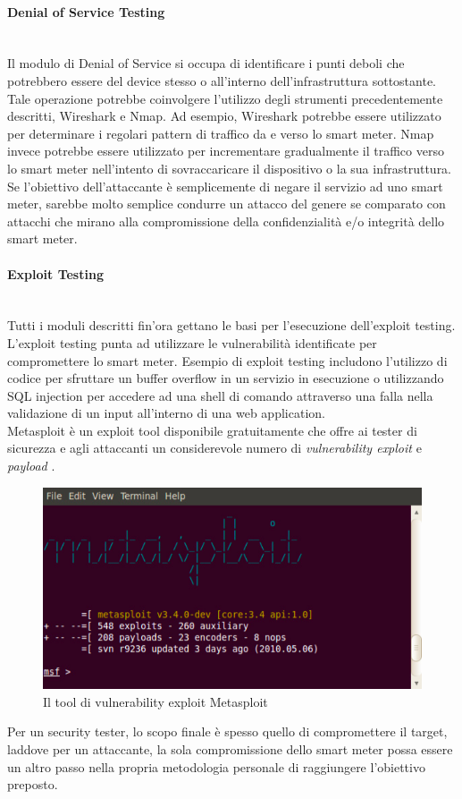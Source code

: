 \paragraph{Denial of Service Testing}\mbox{}\\
Il modulo di Denial of Service si occupa di identificare i punti deboli che potrebbero essere del device stesso o all'interno dell'infrastruttura sottostante. Tale operazione potrebbe coinvolgere l'utilizzo degli strumenti precedentemente descritti, Wireshark e Nmap. Ad esempio, Wireshark potrebbe essere utilizzato per determinare i regolari pattern di traffico da e verso lo smart meter. Nmap invece potrebbe essere utilizzato per incrementare gradualmente il traffico verso lo smart meter nell'intento di sovraccaricare il dispositivo o la sua infrastruttura.\\
Se l'obiettivo dell'attaccante è semplicemente di negare il servizio ad uno smart meter, sarebbe molto semplice condurre un attacco del genere se comparato con attacchi che mirano alla compromissione della confidenzialità e/o integrità dello smart meter.

\paragraph{Exploit Testing}\mbox{}\\
Tutti i moduli descritti fin'ora gettano le basi per l'esecuzione dell'exploit testing. L'exploit testing punta ad utilizzare le vulnerabilità identificate per compromettere lo smart meter. Esempio di exploit testing includono l'utilizzo di codice per sfruttare un buffer overflow in un servizio in esecuzione o utilizzando SQL injection per accedere ad una shell di comando attraverso una falla nella validazione di un input all'interno di una web application.\\
Metasploit è un exploit tool disponibile gratuitamente che offre ai tester di sicurezza e agli attaccanti un considerevole numero di \emph{vulnerability exploit} e \emph{payload} \cite{metasploit}.
\begin{figure}[hbtp]
	\centering
	\includegraphics[scale=.3]{imgs/attack/metasploit.png}
	\caption{Il tool di vulnerability exploit Metasploit}
	\label{metasploit_img}
\end{figure}
Per un security tester, lo scopo finale è spesso quello di compromettere il target, laddove per un attaccante, la sola compromissione dello smart meter possa essere un altro passo nella propria metodologia personale di raggiungere l'obiettivo preposto.

